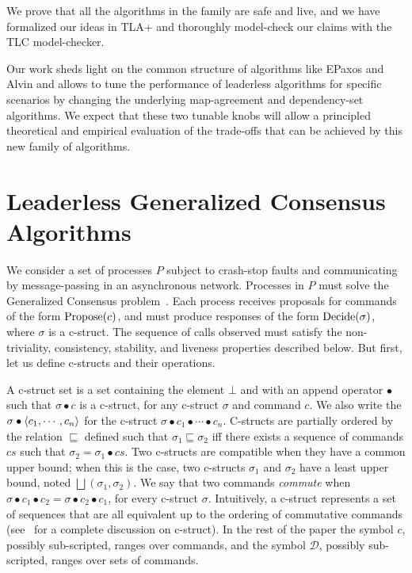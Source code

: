We prove that all the algorithms in the family are safe and live, and we have formalized our ideas in TLA+ and thoroughly model-check our claims with the TLC model-checker.

Our work sheds light on the common structure of algorithms like EPaxos and Alvin and allows to tune the performance of leaderless algorithms for specific scenarios by changing the underlying map-agreement and dependency-set algorithms.
We expect that these two tunable knobs will allow a principled theoretical and empirical evaluation of the trade-offs that can be achieved by this new family of algorithms.

\section{Leaderless Generalized Consensus Algorithms}

We consider a set of processes $P$ subject to crash-stop faults and communicating by message-passing in an asynchronous network. Processes in $P$ must solve the Generalized Consensus problem~\cite{Lamport05GeneralizeConsensus}. Each process receives proposals for commands of the form $\operatorname{Propose}(c)$, and must produce responses of the form $\operatorname{Decide}(\sigma)$, where $\sigma$ is a c-struct. 
The sequence of calls observed must satisfy the non-triviality, consistency, stability, and liveness properties described below. But first, let us define c-structs and their operations.

A c-struct set is a set containing the element $\bot$ and with an append operator $\bullet$ such that $\sigma \bullet c$ is a c-struct, for any c-struct $\sigma$ and command $c$. 
We also write the $\sigma\bullet\left\langle c_1,\cdots,c_n\right\rangle$ for the c-struct $\sigma\bullet c_1\bullet\cdots\bullet c_n$.
C-structs are partially ordered by the relation $\sqsubseteq$ defined such that $\sigma_1\sqsubseteq\sigma_2$ iff there exists a sequence of commands $cs$ such that $\sigma_2=\sigma_1\bullet cs$. Two c-structs are compatible when they have a common upper bound; when this is the case, two c-structs $\sigma_1$ and $\sigma_2$ have a least upper bound, noted $\bigsqcup\left( \sigma_1,\sigma_2 \right)$.
We say that two commands \textit{commute} when $\sigma\bullet c_1\bullet c_2 =  \sigma\bullet c_2\bullet c_1 $, for every c-struct $\sigma$. Intuitively, a c-struct represents a set of sequences that are all equivalent up to the ordering of commutative commands (see~\cite{Lamport05GeneralizeConsensus} for a complete discussion on c-struct). 
In the rest of the paper the symbol $c$, possibly sub-scripted, ranges over commands, and the symbol $\mathcal{D}$, possibly sub-scripted, ranges over sets of commands.

